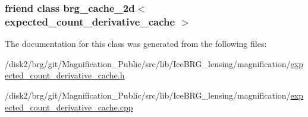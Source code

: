 \subsubsection[{brg\+\_\+cache\+\_\+2d$<$ expected\+\_\+count\+\_\+derivative\+\_\+cache $>$}]{\setlength{\rightskip}{0pt plus 5cm}friend class {\bf brg\+\_\+cache\+\_\+2d}$<$ {\bf expected\+\_\+count\+\_\+derivative\+\_\+cache} $>$\hspace{0.3cm}{\ttfamily [friend]}}\label{classIceBRG_1_1expected__count__derivative__cache_a6cb64b05ca65e864c79c1c875fbfcf6c}


The documentation for this class was generated from the following files\+:\begin{DoxyCompactItemize}
\item 
/disk2/brg/git/\+Magnification\+\_\+\+Public/src/lib/\+Ice\+B\+R\+G\+\_\+lensing/magnification/\hyperlink{expected__count__derivative__cache_8h}{expected\+\_\+count\+\_\+derivative\+\_\+cache.\+h}\item 
/disk2/brg/git/\+Magnification\+\_\+\+Public/src/lib/\+Ice\+B\+R\+G\+\_\+lensing/magnification/\hyperlink{expected__count__derivative__cache_8cpp}{expected\+\_\+count\+\_\+derivative\+\_\+cache.\+cpp}\end{DoxyCompactItemize}
